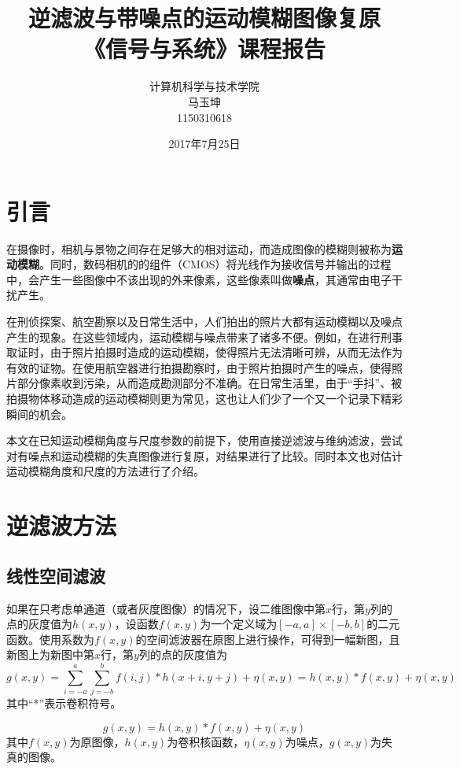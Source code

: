 \documentclass[11pt, a4paper]{article}
\begin{document}
\title{{\bf\Huge 逆滤波与带噪点的运动模糊图像复原} \\[2ex]{\huge 《信号与系统》课程报告}}
\author{计算机科学与技术学院\\马玉坤\\1150310618}
\date{2017年7月25日}
\maketitle
\thispagestyle{empty}
\newpage

\setcounter{page}{1}
\section{引言}
在摄像时，相机与景物之间存在足够大的相对运动，而造成图像的模糊则被称为{\bf 运动模糊}。同时，数码相机的的组件（CMOS）将光线作为接收信号并输出的过程中，会产生一些图像中不该出现的外来像素，这些像素叫做{\bf 噪点}，其通常由电子干扰产生。

在刑侦探案、航空勘察以及日常生活中，人们拍出的照片大都有运动模糊以及噪点产生的现象。在这些领域内，运动模糊与噪点带来了诸多不便。例如，在进行刑事取证时，由于照片拍摄时造成的运动模糊，使得照片无法清晰可辨，从而无法作为有效的证物。在使用航空器进行拍摄勘察时，由于照片拍摄时产生的噪点，使得照片部分像素收到污染，从而造成勘测部分不准确。在日常生活里，由于“手抖”、被拍摄物体移动造成的运动模糊则更为常见，这也让人们少了一个又一个记录下精彩瞬间的机会。

本文在已知运动模糊角度与尺度参数的前提下，使用直接逆滤波与维纳滤波，尝试对有噪点和运动模糊的失真图像进行复原，对结果进行了比较。同时本文也对估计运动模糊角度和尺度的方法进行了介绍。

\section{逆滤波方法}

\subsection{线性空间滤波}

如果在只考虑单通道（或者灰度图像）的情况下，设二维图像中第$x$行，第$y$列的点的灰度值为$h(x,y)$，设函数$f(x,y)$为一个定义域为$[-a,a]\times[-b,b]$的二元函数。使用系数为$f(x,y)$的空间滤波器在原图上进行操作，可得到一幅新图，且新图上为新图中第$x$行，第$y$列的点的灰度值为$$g(x,y)=\sum^{a}_{i=-a}\sum^{b}_{j=-b}f(i,j)*h(x+i,y+j)+\eta(x,y)=h(x,y)*f(x,y)+\eta(x,y)$$其中“*”表示卷积符号。

\begin{equation}\label{eq1}
  g(x,y) = h(x,y)*f(x,y)+\eta(x,y)
\end{equation}
其中$f(x,y)$为原图像，$h(x,y)$为卷积核函数，$\eta(x,y)$为噪点，$g(x,y)$为失真的图像。
\end{document}
